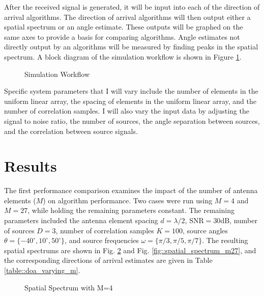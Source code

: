 \documentclass[conference]{IEEEtran}
\begin{document}
		After the received signal is generated, it will be input into each of the direction of arrival algorithms. The direction of arrival algorithms will then output either a spatial spectrum or an angle estimate. These outputs will be graphed on the same axes to provide a basis for comparing algorithms. Angle estimates not directly output by an algorithms will be measured by finding peaks in the spatial spectrum. A block diagram of the simulation workflow is shown in Figure \ref{sim_workflow}.
		
		\begin{figure}[H]
			\centerline{}
			\caption{Simulation Workflow}
			\label{sim_workflow}
		\end{figure}
		
		Specific system parameters that I will vary include the number of elements in the uniform linear array, the spacing of elements in the uniform linear array, and the number of correlation samples. I will also vary the input data by adjusting the signal to noise ratio, the number of sources, the angle separation between sources, and the correlation between source signals.
		
	\section{Results}
	
		The first performance comparison examines the impact of the number of antenna elements ($M$) on algorithm performance. Two cases were run using $M = 4$ and $M=27$, while holding the remaining parameters constant. The remaining parameters included the antenna element spacing $d = \lambda/2$, $\text{SNR}=30\text{dB}$, number of sources $D=3$, number of correlation samples $K=100$, source angles $\theta = \{-40^{\circ}, 10^{\circ}, 50^{\circ}\}$, and source frequencies $\omega = \{\pi/3, \pi/5, \pi/7\}$. The resulting spatial spectrums are shown in Fig. \ref{fig::spatial_spectrum_m4} and Fig. \ref{fig::spatial_spectrum_m27}, and the corresponding directions of arrival estimates are given in Table \ref{table::doa_varying_m}.
		
		\begin{figure}[H]
			\centerline{}
			\caption{Spatial Spectrum with M=4}			
			\label{fig::spatial_spectrum_m4}
		\end{figure}
		
\end{document}
